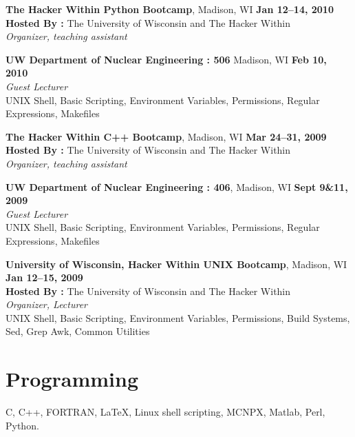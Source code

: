 \documentclass[margin,line]{resume}
\begin{document}
\begin{resume}
    \textbf{The Hacker Within Python Bootcamp}, Madison, WI \hfill \textbf{Jan 12--14, 2010}\\
               \textbf{Hosted By : } The University of Wisconsin and The Hacker Within\\
               \textsl{Organizer, teaching assistant}

    \textbf{UW Department of Nuclear Engineering : 506} Madison, WI \hfill \textbf{Feb 10, 2010}\\ 
               \textsl{Guest Lecturer}\\
               UNIX Shell, Basic Scripting, Environment Variables, Permissions, 
               Regular Expressions, Makefiles 

    \textbf{The Hacker Within C++ Bootcamp}, Madison, WI \hfill \textbf{Mar 24--31, 2009}\\
               \textbf{Hosted By : } The University of Wisconsin and The Hacker Within\\
               \textsl{Organizer, teaching assistant}

    \textbf{UW Department of Nuclear Engineering : 406}, Madison, WI \hfill \textbf{Sept 9\&11, 2009}\\ 
               \textsl{Guest Lecturer}\\
               UNIX Shell, Basic Scripting, Environment Variables, Permissions, 
               Regular Expressions, Makefiles 

    \textbf{University of Wisconsin, Hacker Within UNIX Bootcamp}, Madison, WI \hfill \textbf{Jan 12--15, 2009}\\
               \textbf{Hosted By : } The University of Wisconsin and The Hacker Within\\
               \textsl{Organizer, Lecturer}\\
               UNIX Shell, Basic Scripting, Environment Variables, Permissions, Build Systems, 
               Sed, Grep Awk, Common Utilities

    \section{\mysidestyle Programming} 
		C, C++, FORTRAN, \LaTeX, Linux shell scripting, MCNPX, Matlab, Perl, Python.\vspace{1mm}

		\vspace{-2mm}

\end{resume}
\end{document}
